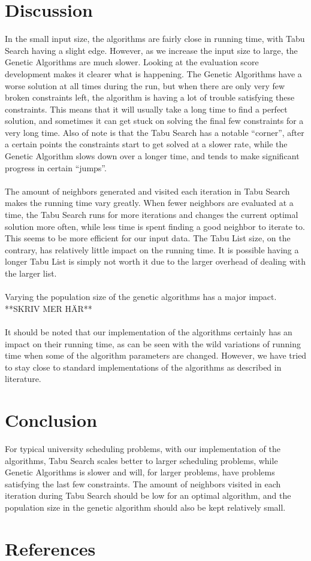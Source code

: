 \documentclass[titlepage,a4paper]{article}
\begin{document}
\pagebreak
\section{Discussion}
In the small input size, the algorithms are fairly close in running time, with Tabu Search having a slight edge. However, as we increase the input size to large, the Genetic Algorithms are much slower. Looking at the evaluation score development makes it clearer what is happening. The Genetic Algorithms have a worse solution at all times during the run, but when there are only very few broken constraints left, the algorithm is having a lot of trouble satisfying these constraints. This means that it will usually take a long time to find a perfect solution, and sometimes it can get stuck on solving the final few constraints for a very long time.
Also of note is that the Tabu Search has a notable “corner”, after a certain points the constraints start to get solved at a slower rate, while the Genetic Algorithm slows down over a longer time, and tends to make significant progress in certain “jumps”. \\\\
The amount of neighbors generated and visited each iteration in Tabu Search makes the running time vary greatly. When fewer neighbors are evaluated at a time, the Tabu Search runs for more iterations and changes the current optimal solution more often, while less time is spent finding a good neighbor to iterate to. This seems to be more efficient for our input data.
The Tabu List size, on the contrary, has relatively little impact on the running time. It is possible having a longer Tabu List is simply not worth it due to the larger overhead of dealing with the larger list. \\\\
Varying the population size of the genetic algorithms has a major impact. **SKRIV MER HÄR** \\\\
It should be noted that our implementation of the algorithms certainly has an impact on their running time, as can be seen with the wild variations of running time when some of the algorithm parameters are changed. However, we have tried to stay close to standard implementations of the algorithms as described in literature.

\pagebreak
\section{Conclusion}
For typical university scheduling problems, with our implementation of the algorithms, Tabu Search scales better to larger scheduling problems, while Genetic Algorithms is slower and will, for larger problems, have problems satisfying the last few constraints. The amount of neighbors visited in each iteration during Tabu Search should be low for an optimal algorithm, and the population size in the genetic algorithm should also be kept relatively small.

\pagebreak
\section{References}



\end{document}
